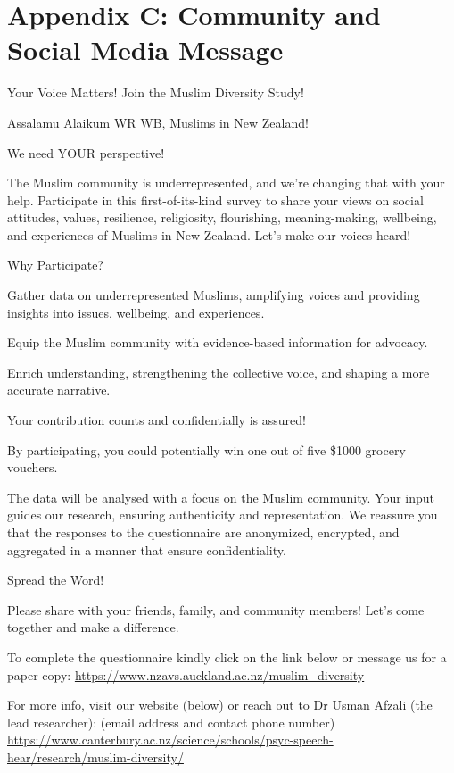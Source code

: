 \documentclass[
]{interact}
\begin{document}
\newpage{}

\section{Appendix C: Community and Social Media
Message}\label{appendix-c-community-and-social-media-message}

Your Voice Matters! Join the Muslim Diversity Study!

\noindent Assalamu Alaikum WR WB, Muslims in New Zealand!

\noindent We need YOUR perspective!

\noindent The Muslim community is underrepresented, and we're changing
that with your help. Participate in this first-of-its-kind survey to
share your views on social attitudes, values, resilience, religiosity,
flourishing, meaning-making, wellbeing, and experiences of Muslims in
New Zealand. Let's make our voices heard!

\noindent Why Participate?

\noindent Gather data on underrepresented Muslims, amplifying voices and
providing insights into issues, wellbeing, and experiences.

\noindent Equip the Muslim community with evidence-based information for
advocacy.

\noindent Enrich understanding, strengthening the collective voice, and
shaping a more accurate narrative.

\noindent Your contribution counts and confidentially is assured!

\noindent By participating, you could potentially win one out of five
\$1000 grocery vouchers.

\noindent The data will be analysed with a focus on the Muslim
community. Your input guides our research, ensuring authenticity and
representation. We reassure you that the responses to the questionnaire
are anonymized, encrypted, and aggregated in a manner that ensure
confidentiality.

\noindent Spread the Word!

\noindent Please share with your friends, family, and community members!
Let's come together and make a difference.

\noindent To complete the questionnaire kindly click on the link below
or message us for a paper copy:
\url{https://www.nzavs.auckland.ac.nz/muslim_diversity}

\noindent For more info, visit our website (below) or reach out to Dr
Usman Afzali (the lead researcher): (email address and contact phone
number)
\url{https://www.canterbury.ac.nz/science/schools/psyc-speech-hear/research/muslim-diversity/}
\end{document}
